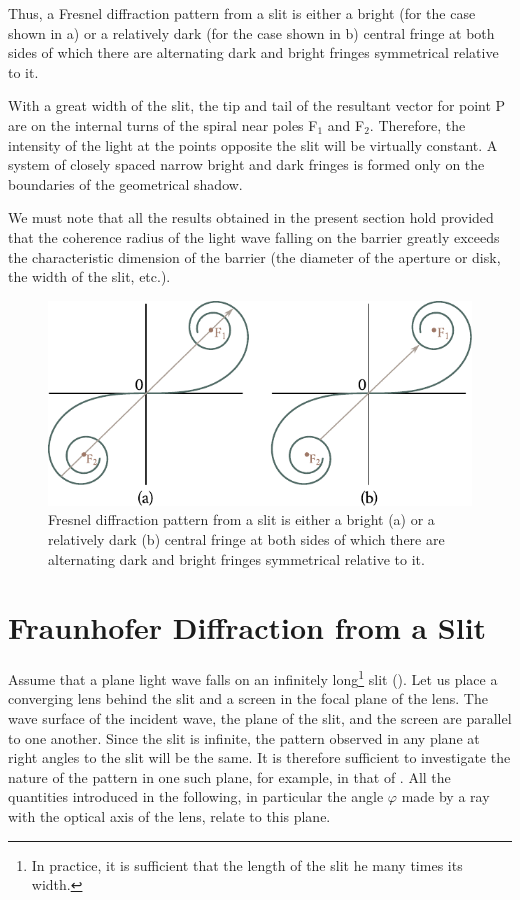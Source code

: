 Thus, a Fresnel diffraction pattern from a slit is either a bright (for the case shown in a) or a relatively dark (for the case
shown in b) central fringe at both sides of which there are alternating dark and bright fringes symmetrical relative to it.

With a great width of the slit, the tip and tail of the resultant vector for point P are on the internal turns of the spiral near poles F$_1$ and F$_2$.
Therefore, the intensity of the light at the points opposite the slit will be virtually constant.
A system of closely spaced narrow bright and dark fringes is formed only on the boundaries of the geometrical shadow.

We must note that all the results obtained in the present section hold provided that the coherence radius of the light wave falling on the barrier greatly exceeds the characteristic dimension of the barrier (the diameter of the aperture or disk, the width of the slit, etc.).

\begin{figure}[!htb]
	\begin{center}
		\includegraphics[scale=1]{figures/ch_18/fig_18_25.pdf}
        \caption[]{Fresnel diffraction pattern from a slit is either a bright (a) or a relatively dark (b) central fringe at both sides of which there are alternating dark and bright fringes symmetrical relative to it.}
		\label{fig:18_25}
	\end{center}
	\vspace{-0.8cm}
\end{figure}

\section{Fraunhofer Diffraction from a Slit}\label{sec:18_5}

Assume that a plane light wave falls on an infinitely long\footnote{In practice, it is sufficient that the length of the slit he many times its width.} slit ().
Let us place a converging lens behind the slit and a screen in the focal plane of the lens.
The wave surface of the incident wave, the plane of the slit, and the screen are parallel to one
another.
Since the slit is infinite, the pattern observed in any plane at right angles to the slit will be the same.
It is therefore sufficient to investigate the nature of the pattern in one such plane, for example, in that of .
All the quantities introduced in the following, in particular the angle $\varphi$ made by a ray with the optical axis of the lens, relate to this plane.

